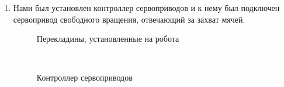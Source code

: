 \begin{enumerate}
\begin{enumerate}
      \item   Нами был установлен контроллер сервоприводов и к нему был подключен сервопривод свободного вращения, отвечающий за захват мячей.\newline
      
      \begin{figure}[H]
      	\begin{minipage}[h]{0.47\linewidth}
      		\caption{Перекладины, установленные на робота} 
      	\end{minipage}
      	\hfill
      	\begin{minipage}[h]{0.47\linewidth}
      		\caption{Контроллер сервоприводов}
      	\end{minipage}
      \end{figure}
      

\end{enumerate}
\end{enumerate}
